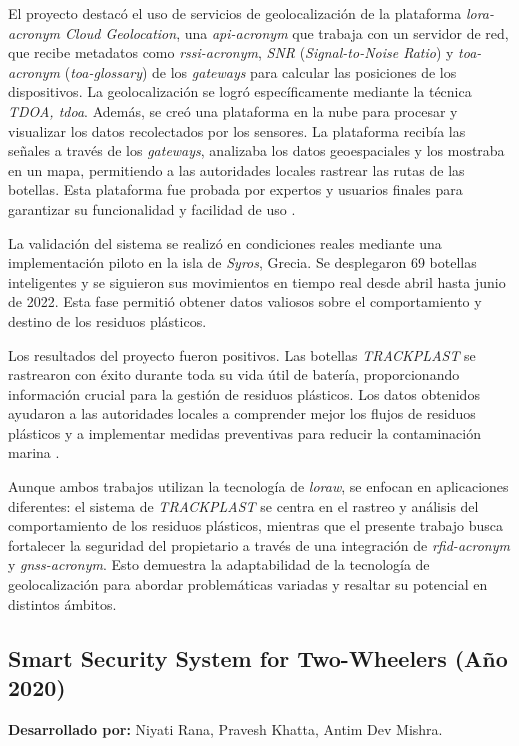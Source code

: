 El proyecto destacó el uso de servicios de geolocalización de la plataforma \textit{\acrshort{lora-acronym} Cloud Geolocation}, una \textit{\acrshort{api-acronym}} que trabaja con un servidor de red, que recibe metadatos como \textit{\acrshort{rssi-acronym}}, \textit{SNR} (\textit{Signal-to-Noise Ratio}) y \textit{\acrshort{toa-acronym}} (\textit{\gls{toa-glossary}}) de los \textit{gateways} para calcular las posiciones de los dispositivos. La geolocalización se logró específicamente mediante la técnica \textit{TDOA, \gls{tdoa}}. Además, se creó una plataforma en la nube para procesar y visualizar los datos recolectados por los sensores. La plataforma recibía las señales a través de los \textit{gateways}, analizaba los datos geoespaciales y los mostraba en un mapa, permitiendo a las autoridades locales rastrear las rutas de las botellas. Esta plataforma fue probada por expertos y usuarios finales para garantizar su funcionalidad y facilidad de uso \cite{Ponis2023}.

La validación del sistema se realizó en condiciones reales mediante una implementación piloto en la isla de \textit{Syros}, Grecia. Se desplegaron 69 botellas inteligentes y se siguieron sus movimientos en tiempo real desde abril hasta junio de 2022. Esta fase permitió obtener datos valiosos sobre el comportamiento y destino de los residuos plásticos.

Los resultados del proyecto fueron positivos. Las botellas \textit{TRACKPLAST} se rastrearon con éxito durante toda su vida útil de batería, proporcionando información crucial para la gestión de residuos plásticos. Los datos obtenidos ayudaron a las autoridades locales a comprender mejor los flujos de residuos plásticos y a implementar medidas preventivas para reducir la contaminación marina \cite{Ponis2023}.

Aunque ambos trabajos utilizan la tecnología de \textit{\acrshort{loraw}}, se enfocan en aplicaciones diferentes: el sistema de \textit{TRACKPLAST} se centra en el rastreo y análisis del comportamiento de los residuos plásticos, mientras que el presente trabajo busca fortalecer la seguridad del propietario a través de una integración de \textit{\acrshort{rfid-acronym}} y \textit{\acrshort{gnss-acronym}}. Esto demuestra la adaptabilidad de la tecnología de geolocalización para abordar problemáticas variadas y resaltar su potencial en distintos ámbitos.


\subsection{Smart Security System for Two-Wheelers (Año 2020)}
\textbf{Desarrollado por:} Niyati Rana, Pravesh Khatta, Antim Dev Mishra.

